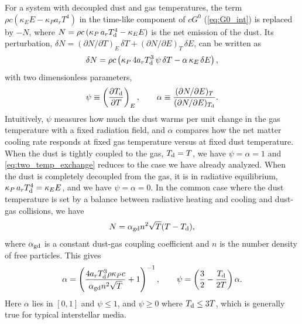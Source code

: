 \documentclass[preprint,12pt,authoryear]{elsarticle}
\begin{document}
For a system with decoupled dust and gas temperatures, the term $\rho c (\kappa_E E - \kappa_P a_r T^4)$ in the time-like component of $cG^0$ (\autoref{eq:G0_int}) is replaced by $-N$, where $N = \rho c\,(\kappa_P\, a_r T_{\rm d}^4 - \kappa_E E)$ is the net emission of the dust. Its perturbation, $\delta N = (\partial N/\partial T)_E\,\delta T + (\partial N/\partial E)_T\,\delta E$, can be written as
\begin{equation}
    \delta N = \rho c\left(\kappa_P\, 4 a_r T_{\rm d}^3\,\psi\,\delta T - \alpha\,\kappa_E\,\delta E\right),
    \label{eq:two_temp_exchange}
\end{equation}
with two dimensionless parameters,
\begin{equation}
    \psi \equiv \left(\frac{\partial T_{\rm d}}{\partial T}\right)_E,
    \qquad
    \alpha \equiv \frac{(\partial N/\partial E)_T}{(\partial N/\partial E)_{T_{\rm d}}} .
    \label{eq:psi_alpha}
\end{equation}
Intuitively, $\psi$ measures how much the dust warms per unit change in the gas temperature with a fixed radiation field, and $\alpha$ compares how the net matter cooling rate responds at fixed gas temperature versus at fixed dust temperature. When the dust is tightly coupled to the gas, $T_{\rm d} = T$, we have $\psi = \alpha = 1$ and \autoref{eq:two_temp_exchange} reduces to the case we have already analyzed. When the dust is completely decoupled from the gas, it is in radiative equilibrium, $\kappa_P\, a_r T_{\rm d}^4 = \kappa_E E$, and we have $\psi = \alpha = 0$. In the common case where the dust temperature is set by a balance between radiative heating and cooling and dust-gas collisions, we have \citep[e.g.,][]{Goldsmith01a}
\begin{equation}
    N = \alpha_{\rm gd} n^2 \sqrt{T} (T - T_{\rm d}),
\end{equation}
where $\alpha_{\rm gd}$ is a constant dust-gas coupling coefficient and $n$ is the number density of free particles. This gives
\begin{equation}
    \alpha = \left(\frac{4 a_r T_{\rm d}^3 \rho \kappa_P c}{\alpha_{\rm gd} n^2 \sqrt{T}} + 1 \right)^{-1},
    \qquad
    \psi = \left(\frac{3}{2} - \frac{T_{\rm d}}{2T}\right)\alpha.
\end{equation}
Here $\alpha$ lies in $[0,1]$ and $\psi \leq 1$, and $\psi \geq 0$ where $T_{\rm d} \leq 3T$, which is generally true for typical interstellar media.
\end{document}

